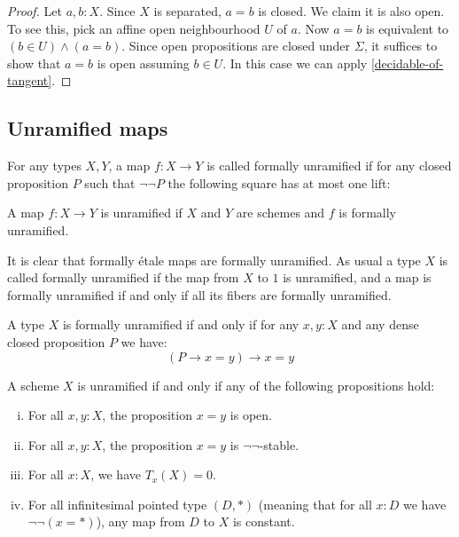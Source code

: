 \begin{proof}
	Let $a, b : X$. Since $X$ is separated, $a = b$ is closed.
	We claim it is also open.
	To see this, pick an affine open neighbourhood $U$ of $a$.
	Now $a = b$ is equivalent to $(b \in U) \wedge (a = b)$.
	Since open propositions are closed under $\Sigma$,
	it suffices to show that $a = b$ is open assuming $b \in U$.
	In this case we can apply \cref{decidable-of-tangent}.
\end{proof}

\subsection{Unramified maps}

\begin{definition}
For any types $X,Y$, a map $f:X\to Y$ is called formally unramified if for any closed proposition $P$ such that $\neg\neg P$ the following square has at most one lift:
 \begin{center}
    \end{center}
\end{definition}

\begin{definition}
A map $f:X\to Y$ is unramified if $X$ and $Y$ are schemes and $f$ is formally unramified.
\end{definition}

It is clear that formally étale maps are formally unramified. As usual a type $X$ is called formally unramified if the map from $X$ to $1$ is unramified, and a map is formally unramified if and only if all its fibers are formally unramified.

\begin{lemma}
A type $X$ is formally unramified if and only if for any $x,y:X$ and any dense closed proposition $P$ we have:
\[
(P\to x=y)\to x=y
\]
\end{lemma}

\begin{proposition}
A scheme $X$ is unramified if and only if any of the following propositions hold:
  \begin{enumerate}[(i)]
  \item For all $x,y:X$, the proposition $x=y$ is open.
  \item For all $x,y:X$, the proposition $x=y$ is $\neg\neg$-stable.
  \item For all $x:X$, we have $T_x(X)=0$.
  \item For all infinitesimal pointed type $(D,*)$ (meaning that for all $x:D$ we have $\neg\neg(x=*)$), any map from $D$ to $X$ is constant.
  \end{enumerate}
\end{proposition}

